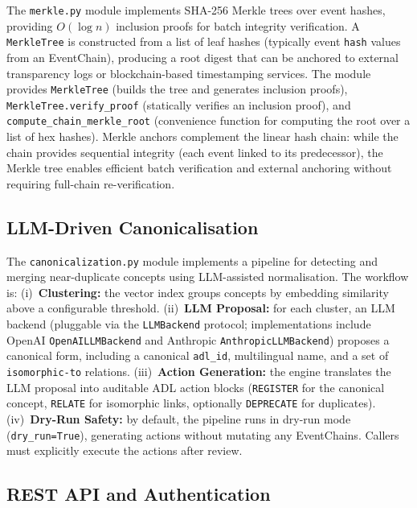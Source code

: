 The \texttt{merkle.py} module implements SHA-256 Merkle trees over event hashes, providing $O(\log n)$ inclusion proofs for batch integrity verification. A \texttt{MerkleTree} is constructed from a list of leaf hashes (typically event \texttt{hash} values from an EventChain), producing a root digest that can be anchored to external transparency logs or blockchain-based timestamping services. The module provides \texttt{MerkleTree} (builds the tree and generates inclusion proofs), \texttt{MerkleTree.verify\_proof} (statically verifies an inclusion proof), and \texttt{compute\_chain\_merkle\_root} (convenience function for computing the root over a list of hex hashes). Merkle anchors complement the linear hash chain: while the chain provides sequential integrity (each event linked to its predecessor), the Merkle tree enables efficient batch verification and external anchoring without requiring full-chain re-verification.

\subsection{LLM-Driven Canonicalisation}\label{app:canonicalization}

The \texttt{canonicalization.py} module implements a pipeline for detecting and merging near-duplicate concepts using LLM-assisted normalisation. The workflow is: (i)~\textbf{Clustering:} the vector index groups concepts by embedding similarity above a configurable threshold. (ii)~\textbf{LLM Proposal:} for each cluster, an LLM backend (pluggable via the \texttt{LLMBackend} protocol; implementations include OpenAI \texttt{OpenAILLMBackend} and Anthropic \texttt{AnthropicLLMBackend}) proposes a canonical form, including a canonical \texttt{adl\_id}, multilingual name, and a set of \texttt{isomorphic-to} relations. (iii)~\textbf{Action Generation:} the engine translates the LLM proposal into auditable ADL action blocks (\texttt{REGISTER} for the canonical concept, \texttt{RELATE} for isomorphic links, optionally \texttt{DEPRECATE} for duplicates). (iv)~\textbf{Dry-Run Safety:} by default, the pipeline runs in dry-run mode (\texttt{dry\_run=True}), generating actions without mutating any EventChains. Callers must explicitly execute the actions after review.

\subsection{REST API and Authentication}\label{app:rest-api}

